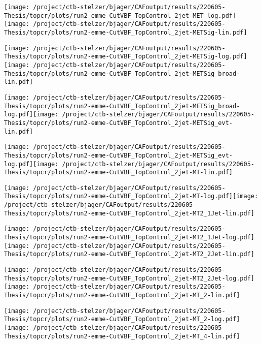 \documentclass{article}
\begin{document}
\texttt{[image: /project/ctb-stelzer/bjager/CAFoutput/results/220605-Thesis/topcr/plots/run2-emme-CutVBF\_TopControl\_2jet-MET-log.pdf]}\texttt{[image: /project/ctb-stelzer/bjager/CAFoutput/results/220605-Thesis/topcr/plots/run2-emme-CutVBF\_TopControl\_2jet-METSig-lin.pdf]}

\texttt{[image: /project/ctb-stelzer/bjager/CAFoutput/results/220605-Thesis/topcr/plots/run2-emme-CutVBF\_TopControl\_2jet-METSig-log.pdf]}\texttt{[image: /project/ctb-stelzer/bjager/CAFoutput/results/220605-Thesis/topcr/plots/run2-emme-CutVBF\_TopControl\_2jet-METSig\_broad-lin.pdf]}

\texttt{[image: /project/ctb-stelzer/bjager/CAFoutput/results/220605-Thesis/topcr/plots/run2-emme-CutVBF\_TopControl\_2jet-METSig\_broad-log.pdf]}\texttt{[image: /project/ctb-stelzer/bjager/CAFoutput/results/220605-Thesis/topcr/plots/run2-emme-CutVBF\_TopControl\_2jet-METSig\_evt-lin.pdf]}

\texttt{[image: /project/ctb-stelzer/bjager/CAFoutput/results/220605-Thesis/topcr/plots/run2-emme-CutVBF\_TopControl\_2jet-METSig\_evt-log.pdf]}\texttt{[image: /project/ctb-stelzer/bjager/CAFoutput/results/220605-Thesis/topcr/plots/run2-emme-CutVBF\_TopControl\_2jet-MT-lin.pdf]}

\texttt{[image: /project/ctb-stelzer/bjager/CAFoutput/results/220605-Thesis/topcr/plots/run2-emme-CutVBF\_TopControl\_2jet-MT-log.pdf]}\texttt{[image: /project/ctb-stelzer/bjager/CAFoutput/results/220605-Thesis/topcr/plots/run2-emme-CutVBF\_TopControl\_2jet-MT2\_1Jet-lin.pdf]}

\texttt{[image: /project/ctb-stelzer/bjager/CAFoutput/results/220605-Thesis/topcr/plots/run2-emme-CutVBF\_TopControl\_2jet-MT2\_1Jet-log.pdf]}\texttt{[image: /project/ctb-stelzer/bjager/CAFoutput/results/220605-Thesis/topcr/plots/run2-emme-CutVBF\_TopControl\_2jet-MT2\_2Jet-lin.pdf]}

\texttt{[image: /project/ctb-stelzer/bjager/CAFoutput/results/220605-Thesis/topcr/plots/run2-emme-CutVBF\_TopControl\_2jet-MT2\_2Jet-log.pdf]}\texttt{[image: /project/ctb-stelzer/bjager/CAFoutput/results/220605-Thesis/topcr/plots/run2-emme-CutVBF\_TopControl\_2jet-MT\_2-lin.pdf]}

\texttt{[image: /project/ctb-stelzer/bjager/CAFoutput/results/220605-Thesis/topcr/plots/run2-emme-CutVBF\_TopControl\_2jet-MT\_2-log.pdf]}\texttt{[image: /project/ctb-stelzer/bjager/CAFoutput/results/220605-Thesis/topcr/plots/run2-emme-CutVBF\_TopControl\_2jet-MT\_4-lin.pdf]}
\end{document}
